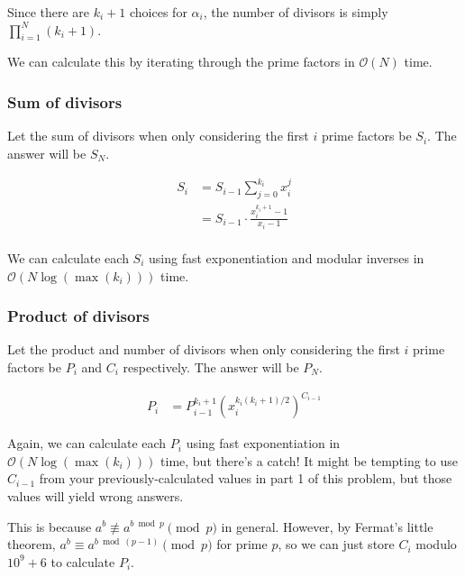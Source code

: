                     Since there are $k_i + 1$ choices for $\alpha_i$, the number of divisors is
                    simply $\prod_{i = 1}^N (k_i + 1)$.
                    
                    We can calculate this by iterating through the prime factors in $\mathcal O(N)$
                    time.
                    
            \subsubsection{Sum of divisors}
            
                Let the sum of divisors when only considering the first $i$ prime factors be $S_i$. The answer will be $S_N$.
                
                $$\begin{aligned} S_i &= S_{i - 1} \sum_{j = 0}^{k_i} x_i^j\\ &= S_{i - 1} \cdot \frac{x_i^{k_i + 1} - 1}{x_i - 1}\\ \end{aligned}$$
                
                We can calculate each $S_i$ using fast exponentiation and modular inverses in
            $\mathcal O(N \log(\max(k_i)))$ time.
            
            \subsubsection{Product of divisors}

                Let the product and number of divisors when only considering the first $i$ prime
                factors be $P_i$ and $C_i$ respectively. The answer will be $P_N$.
                
                $$\begin{aligned} P_i &= P_{i - 1}^{k_i + 1} \left(x_i^{k_i(k_i + 1)/2} \right)^{C_{i - 1}} \end{aligned}$$
                
                Again, we can calculate each $P_i$ using fast exponentiation in
                $\mathcal O(N \log(\max(k_i)))$ time, but there's a catch! It might be tempting
                to use $C_{i - 1}$ from your previously-calculated values in part 1 of this
                problem, but those values will yield wrong answers.
                
                This is because $a^b \not \equiv a^{b \bmod p} \pmod{p}$ in general. However, by
                Fermat's little theorem, $a^b \equiv a^{b \bmod (p - 1)} \pmod{p}$ for prime
                $p$, so we can just store $C_i$ modulo $10^9 + 6$ to calculate $P_i$.

